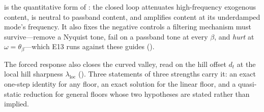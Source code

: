 \documentclass[11pt,a4paper]{article}
\theoremstyle{remark}
\begin{document}
 is the quantitative form of : the closed loop attenuates high-frequency exogenous content, is neutral to passband content, and amplifies content at its underdamped mode's frequency.
It also fixes the negative controls a filtering mechanism must survive---remove a Nyquist tone, fail on a passband tone at every $\beta$, and \emph{hurt} at $\omega=\theta_\beta$---which E13 runs against these guides ().

The forced response also closes the curved valley, read on the hill offset $d_t$ at the local hill sharpness $\lambda_{\mathrm{loc}}$ ().
Three statements of three strengths carry it: an exact one-step identity for any floor, an exact solution for the linear floor, and a quasi-static reduction for general floors whose two hypotheses are stated rather than implied.
\end{document}
